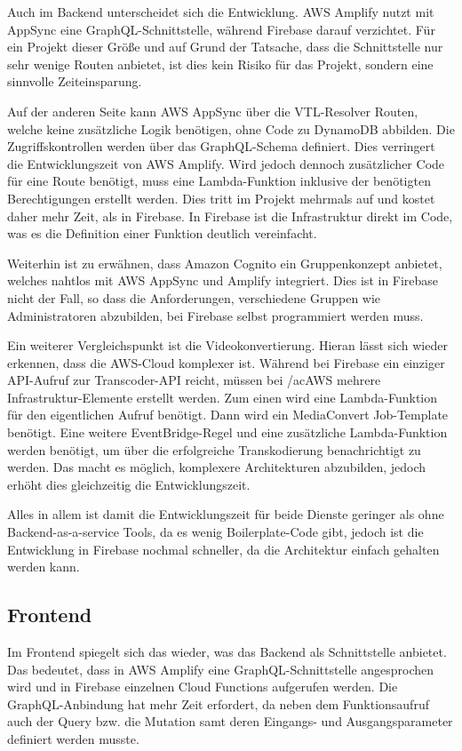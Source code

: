 Auch im Backend unterscheidet sich die Entwicklung. \ac{AWS} Amplify nutzt mit AppSync eine GraphQL-Schnittstelle, während Firebase darauf verzichtet. Für ein Projekt dieser Größe und auf Grund der Tatsache, dass die Schnittstelle nur sehr wenige Routen anbietet, ist dies kein Risiko für das Projekt, sondern eine sinnvolle Zeiteinsparung.

Auf der anderen Seite kann \ac{AWS} AppSync über die VTL-Resolver Routen, welche keine zusätzliche Logik benötigen, ohne Code zu DynamoDB abbilden. Die Zugriffskontrollen werden über das GraphQL-Schema definiert. Dies verringert die Entwicklungszeit von \ac{AWS} Amplify. Wird jedoch dennoch zusätzlicher Code für eine Route benötigt, muss eine Lambda-Funktion inklusive der benötigten Berechtigungen erstellt werden. Dies tritt im Projekt mehrmals auf und kostet daher mehr Zeit, als in Firebase. In Firebase ist die Infrastruktur direkt im Code, was es die Definition einer Funktion deutlich vereinfacht.

Weiterhin ist zu erwähnen, dass Amazon Cognito ein Gruppenkonzept anbietet, welches nahtlos mit \ac{AWS} AppSync und Amplify integriert. Dies ist in Firebase nicht der Fall, so dass die Anforderungen, verschiedene Gruppen wie Administratoren abzubilden, bei Firebase selbst programmiert werden muss.

Ein weiterer Vergleichspunkt ist die Videokonvertierung. Hieran lässt sich wieder erkennen, dass die \ac{AWS}-Cloud komplexer ist. Während bei Firebase ein einziger API-Aufruf zur Transcoder-API reicht, müssen bei /ac{AWS} mehrere Infrastruktur-Elemente erstellt werden. Zum einen wird eine Lambda-Funktion für den eigentlichen Aufruf benötigt. Dann wird ein MediaConvert Job-Template benötigt. Eine weitere EventBridge-Regel und eine zusätzliche Lambda-Funktion werden benötigt, um über die erfolgreiche Transkodierung benachrichtigt zu werden. Das macht es möglich, komplexere Architekturen abzubilden, jedoch erhöht dies gleichzeitig die Entwicklungszeit.

Alles in allem ist damit die Entwicklungszeit für beide Dienste geringer als ohne Backend-as-a-service Tools, da es wenig Boilerplate-Code gibt, jedoch ist die Entwicklung in Firebase nochmal schneller, da die Architektur einfach gehalten werden kann.

\subsection{Frontend}

Im Frontend spiegelt sich das wieder, was das Backend als Schnittstelle anbietet. Das bedeutet, dass in \ac{AWS} Amplify eine GraphQL-Schnittstelle angesprochen wird und in Firebase einzelnen Cloud Functions aufgerufen werden. Die GraphQL-Anbindung hat mehr Zeit erfordert, da neben dem Funktionsaufruf auch der Query bzw. die Mutation samt deren Eingangs- und Ausgangsparameter definiert werden musste.

